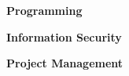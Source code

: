 \cventrytwo
{
{}
\begin{cvitemsone}
{
\item {\textbf{Programming}}
\item {\textbf{Information Security}}
\item {\textbf{Project Management}}
}
\end{cvitemsone}
}
